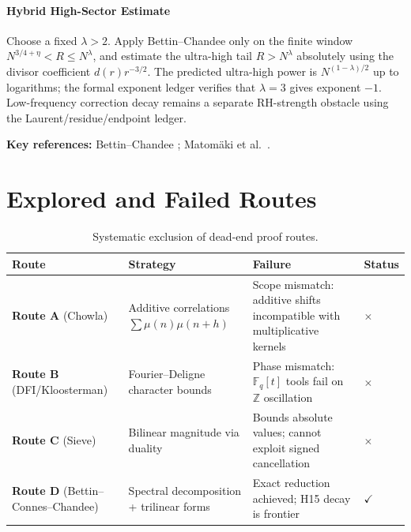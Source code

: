 \documentclass[11pt,a4paper]{article}
\theoremstyle{plain}
\theoremstyle{definition}
\theoremstyle{remark}
\begin{document}
\paragraph{Hybrid High-Sector Estimate}

Choose a fixed $\lambda>2$. Apply Bettin--Chandee only on the finite window
$N^{3/4+\eta}<R\le N^\lambda$, and estimate the ultra-high tail
$R>N^\lambda$ absolutely using the divisor coefficient $d(r)r^{-3/2}$.
The predicted ultra-high power is $N^{(1-\lambda)/2}$ up to logarithms; the
formal exponent ledger verifies that $\lambda=3$ gives exponent $-1$.
Low-frequency correction decay remains a separate RH-strength
obstacle using the Laurent/residue/endpoint ledger.

\textbf{Key references:} Bettin--Chandee \cite{BettinChandee2015}; Matom\"aki et al.\ \cite{MRTT2023}.

\section{Explored and Failed Routes}
\label{sec:failed_routes}

\begin{table}[htbp]
\centering
\small
\begin{tabular}{lp{4cm}p{4.5cm}l}
\toprule
\textbf{Route} & \textbf{Strategy} & \textbf{Failure} & \textbf{Status} \\
\midrule
\textbf{Route A} (Chowla) & Additive correlations $\sum \mu(n)\mu(n+h)$ & Scope mismatch: additive shifts incompatible with multiplicative kernels & $\times$ \\
\textbf{Route B} (DFI/Kloosterman) & Fourier--Deligne character bounds & Phase mismatch: $\mathbb{F}_q[t]$ tools fail on $\mathbb{Z}$ oscillation & $\times$ \\
\textbf{Route C} (Sieve) & Bilinear magnitude via duality & Bounds absolute values; cannot exploit signed cancellation & $\times$ \\
\textbf{Route D} (Bettin--Connes--Chandee) & Spectral decomposition + trilinear forms & Exact reduction achieved; H15 decay is frontier & $\checkmark$ \\
\bottomrule
\end{tabular}
\caption{Systematic exclusion of dead-end proof routes.}
\label{tab:routes}
\end{table}
\end{document}
